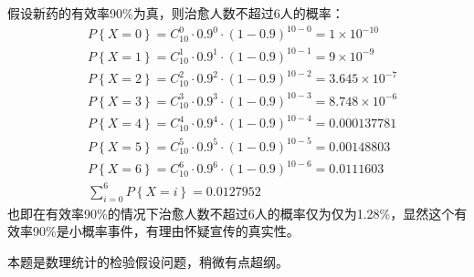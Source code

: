 假设新药的有效率90\%为真，则治愈人数不超过6人的概率：
\begin{align*}
&P\left\{ X=0 \right\} =C_{10}^{0}\cdot 0.9^0\cdot \left( 1-0.9 \right) ^{10-0}=1\times 10^{-10} \\
&P\left\{ X=1 \right\} =C_{10}^{1}\cdot 0.9^1\cdot \left( 1-0.9 \right) ^{10-1}=9\times 10^{-9} \\
&P\left\{ X=2 \right\} =C_{10}^{2}\cdot 0.9^2\cdot \left( 1-0.9 \right) ^{10-2}=3.645\times 10^{-7} \\
&P\left\{ X=3 \right\} =C_{10}^{3}\cdot 0.9^3\cdot \left( 1-0.9 \right) ^{10-3}=8.748\times 10^{-6} \\
&P\left\{ X=4 \right\} =C_{10}^{4}\cdot 0.9^4\cdot \left( 1-0.9 \right) ^{10-4}=0.000137781 \\
&P\left\{ X=5 \right\} =C_{10}^{5}\cdot 0.9^5\cdot \left( 1-0.9 \right) ^{10-5}=0.00148803 \\
&P\left\{ X=6 \right\} =C_{10}^{6}\cdot 0.9^6\cdot \left( 1-0.9 \right) ^{10-6}=0.0111603 \\
&\sum_{i=0}^6{P\left\{ X=i \right\}}=0.0127952
\end{align*}
也即在有效率90\%的情况下治愈人数不超过6人的概率仅为仅为1.28\%，显然这个有效率90\%是小概率事件，有理由怀疑宣传的真实性。

\begin{tcolorbox}
本题是数理统计的检验假设问题，稍微有点超纲。
\end{tcolorbox}




